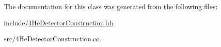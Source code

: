 The documentation for this class was generated from the following files\+:\begin{DoxyCompactItemize}
\item 
include/\hyperlink{4HeDetectorConstruction_8hh}{4\+He\+Detector\+Construction.\+hh}\item 
src/\hyperlink{4HeDetectorConstruction_8cc}{4\+He\+Detector\+Construction.\+cc}\end{DoxyCompactItemize}
